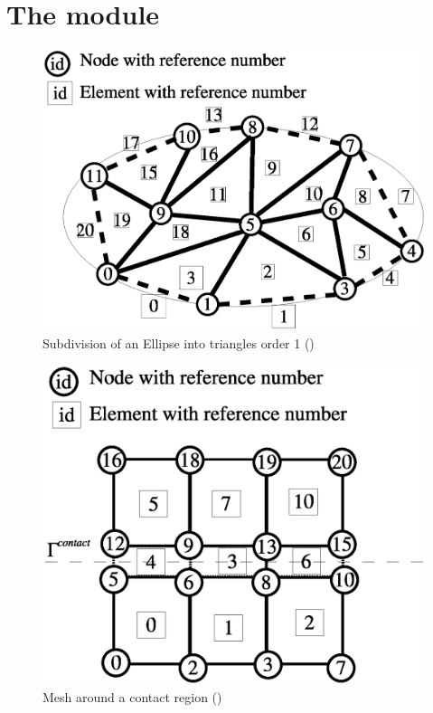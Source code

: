%
%



\chapter{ The module \finley}
 \label{CHAPTER ON FINLEY}

\begin{figure}
\centerline{\includegraphics[width=\figwidth]{figures/FinleyMesh.eps}}
\caption{Subdivision of an Ellipse into triangles order 1 ()}
\label{FINLEY FIG 0}
\end{figure}

\begin{figure}
\centerline{\includegraphics[width=\figwidth]{figures/FinleyContact.eps}}
\caption{Mesh around a contact region ()}
\label{FINLEY FIG 01}
\end{figure}

